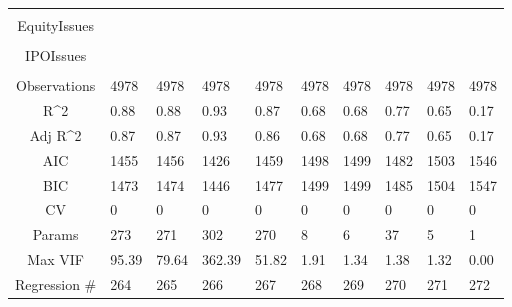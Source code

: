 \documentclass{article}
\begin{document}
\begin{table}[H]
\begin{tabular}{|clllllllll|}
   &  &  &  &  &  &  &  &  &  \\ 
  EquityIssues &  &  &  &  &  &  &  &  &  \\ 
   &  &  &  &  &  &  &  &  &  \\ 
  IPOIssues &  &  &  &  &  &  &  &  &  \\ 
   &  &  &  &  &  &  &  &  &  \\ 
  \hline 
 Observations & 4978 & 4978 & 4978 & 4978 & 4978 & 4978 & 4978 & 4978 & 4978 \\ 
  R^2 & 0.88 & 0.88 & 0.93 & 0.87 & 0.68 & 0.68 & 0.77 & 0.65 & 0.17 \\ 
  Adj R^2 & 0.87 & 0.87 & 0.93 & 0.86 & 0.68 & 0.68 & 0.77 & 0.65 & 0.17 \\ 
  AIC & 1455 & 1456 & 1426 & 1459 & 1498 & 1499 & 1482 & 1503 & 1546 \\ 
  BIC & 1473 & 1474 & 1446 & 1477 & 1499 & 1499 & 1485 & 1504 & 1547 \\ 
  CV & 0 & 0 & 0 & 0 & 0 & 0 & 0 & 0 & 0 \\ 
  Params & 273 & 271 & 302 & 270 & 8 & 6 & 37 & 5 & 1 \\ 
  Max VIF & 95.39 & 79.64 & 362.39 & 51.82 & 1.91 & 1.34 & 1.38 & 1.32 & 0.00 \\ 
  Regression \# & 264 & 265 & 266 & 267 & 268 & 269 & 270 & 271 & 272 \\ 
   \hline
\end{tabular}
 
\end{table}
\end{document}
